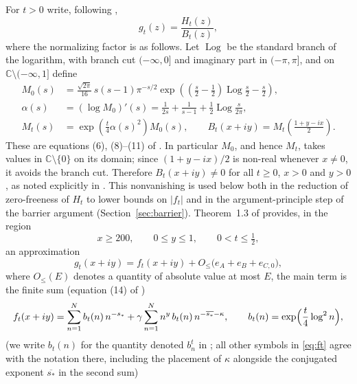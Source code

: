 \documentclass[11pt]{article}
\theoremstyle{definition}
\newcommand{\C}{\mathbb{C}}
\begin{document}
For $t>0$ write, following \cite{Polymath},
\begin{equation}\label{eq:gt}
g_t(z)=\frac{H_t(z)}{B_t(z)},
\end{equation}
where the normalizing factor is as follows.  Let $\operatorname{Log}$ be the
standard branch of the logarithm, with branch cut $(-\infty,0]$ and
imaginary part in $(-\pi,\pi]$, and on
$\C\setminus(-\infty,1]$ define
\begin{align}
M_0(s)&=\frac{\sqrt{2\pi}}{16}\,s(s-1)\pi^{-s/2}
 \exp\!\left(\left(\frac{s}{2}-\frac12\right)\operatorname{Log}\frac{s}{2}
 -\frac{s}{2}\right),\label{eq:M0}\\
\alpha(s)&=(\log M_0)'(s)
 =\frac{1}{2s}+\frac{1}{s-1}+\frac12\operatorname{Log}\frac{s}{2\pi},
 \label{eq:alpha}\\
M_t(s)&=\exp\!\left(\frac t4\alpha(s)^2\right)M_0(s),
\qquad
B_t(x+iy)=M_t\!\left(\frac{1+y-ix}{2}\right).
\label{eq:MtBt}
\end{align}
These are equations (6), (8)--(11) of \cite{Polymath}.  In particular
$M_0$, and hence $M_t$, takes values in $\C\setminus\{0\}$ on its
domain; since $(1+y-ix)/2$ is non-real whenever $x\neq0$, it avoids
the branch cut. Therefore $B_t(x+iy)\neq0$ for all $t\ge0$, $x>0$ and
$y>0$, as noted explicitly in \cite[\S1, after (11)]{Polymath}. This
nonvanishing is used below both in the reduction of zero-freeness of
$H_t$ to lower bounds on $|f_t|$ and in the argument-principle step
of the barrier argument (Section~\ref{sec:barrier}).
Theorem~1.3 of \cite{Polymath} provides, in the region
\begin{equation}\label{eq:region}
x\ge200,\qquad 0\le y\le1,\qquad 0<t\le\tfrac12,
\end{equation}
an approximation
\begin{equation}\label{eq:thm13}
g_t(x+iy)=f_t(x+iy)+O_{\le}\bigl(e_A+e_B+e_{C,0}\bigr),
\end{equation}
where $O_\le(E)$ denotes a quantity of absolute value at most $E$, the
main term is the finite sum (equation (14) of \cite{Polymath})
\begin{equation}\label{eq:ft}
f_t(x+iy)
=\sum_{n=1}^{N}b_t(n)\,n^{-s_*}
+\gamma\sum_{n=1}^{N}n^{y}\,b_t(n)\,n^{-\overline{s_*}-\kappa},
\qquad
b_t(n)=\exp\Bigl(\frac t4\log^2 n\Bigr),
\end{equation}
(we write $b_t(n)$ for the quantity denoted $b_n^t$ in
\cite{Polymath}; all other symbols in \eqref{eq:ft} agree with the
notation there, including the placement of $\kappa$ alongside the
conjugated exponent $\overline{s_*}$ in the second sum)
\end{document}
